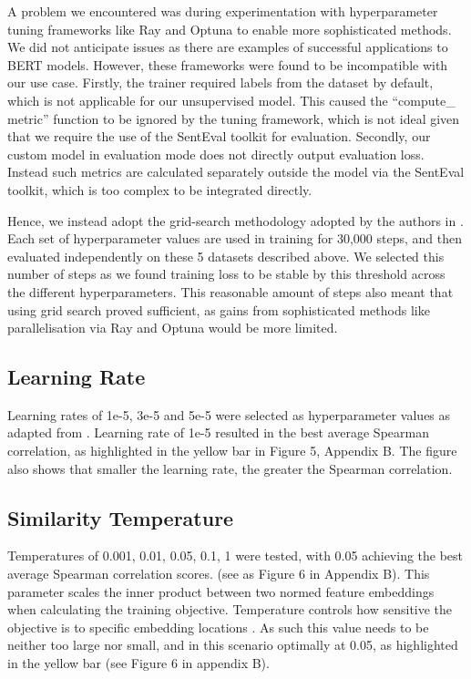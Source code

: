 \documentclass[10pt,twocolumn,letterpaper]{article}
\begin{document}
A problem we encountered was during experimentation with hyperparameter tuning frameworks like Ray and Optuna to enable more sophisticated methods. We did not anticipate issues as there are examples of successful applications to BERT models. However, these frameworks were found to be incompatible with our use case. Firstly, the trainer required labels from the dataset by default, which is not applicable for our unsupervised model. This caused the ``compute\_ metric'' function to be ignored by the tuning framework, which is not ideal given that we require the use of the SentEval toolkit for evaluation. Secondly, our custom model in evaluation mode does not directly output evaluation loss. Instead such metrics are calculated separately outside the model via the SentEval toolkit, which is too complex to be integrated directly.

Hence, we instead adopt the grid-search methodology adopted by the authors in \cite{2104.08821}. Each set of hyperparameter values are used in training for 30,000 steps, and then evaluated independently on these 5 datasets described above. We selected this number of steps as we found training loss to be stable by this threshold across the different hyperparameters. This reasonable amount of steps also meant that using grid search proved sufficient, as gains from sophisticated methods like parallelisation via Ray and Optuna would be more limited.


\subsection{Learning Rate}

Learning rates of 1e-5, 3e-5 and 5e-5 were selected as hyperparameter values as adapted from \cite{2104.08821}. Learning rate of 1e-5  resulted in the best average Spearman correlation, as highlighted in the yellow bar in Figure 5, Appendix B. The figure also shows that smaller the learning rate, the greater the Spearman correlation.

\subsection{Similarity Temperature}

Temperatures of 0.001, 0.01, 0.05, 0.1, 1 were tested, with 0.05 achieving the best average Spearman correlation scores. (see as Figure 6 in Appendix B). This parameter scales the inner product between two normed feature embeddings\cite{2112.01642} when calculating the training objective. Temperature controls how sensitive the objective is to specific embedding locations \cite{2110.04403}. As such this value needs to be neither too large nor small, and in this scenario optimally at 0.05, as highlighted in the yellow bar (see Figure 6 in appendix B).
\end{document}
